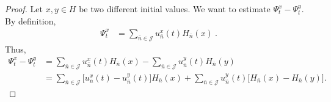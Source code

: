 \documentclass[review, onefignum, onetabnum]{siamart171218}
\begin{document}
\begin{proof}
Let $x,y\in H$ be two different initial values. We want to estimate
$\Psi_t^x-\Psi_t^y$. By definition,
\begin{align}
    \Psi_t^x
        &= \sum_{\bar n\in \mathcal{J}}
            u_{\bar n} ^ x(t) H_{\bar n}(x) \ .
\end{align}
Thus,
%
\begin{equation}
    \label{s3.4}
    \begin{aligned}
        \Psi_t^x-\Psi_t^y
        &=
            \sum_{\bar n\in \mathcal{J}}
                u_{\bar n}^x(t)H_{\bar n}(x)
            -
            \sum_{\bar n\in \mathcal{J}}
                u_{\bar n}^y(t)H_{\bar n}(y)
       \\
        &=
            \sum_{\bar n\in \mathcal{J}}
                \Big[ u_{\bar n}^x(t )- u_{\bar n}^y(t)
                \Big]H_{\bar n}(x)
            +
            \sum_{\bar n\in \mathcal{J}}
                u_{\bar n}^y(t)
                \Big[
                    H_{\bar n}(x) - H_{\bar n}(y)
                \Big].
    \end{aligned}
\end{equation}


\end{proof}
\end{document}
